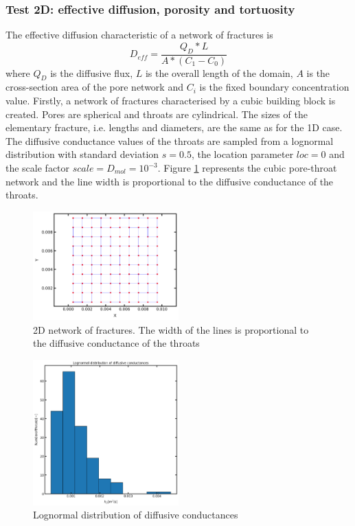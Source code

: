 \documentclass{article}
\begin{document}
\subsubsection{Test 2D: effective diffusion, porosity and tortuosity}
The effective diffusion characteristic of a network of fractures is
\begin{equation}
    D_{eff}=\frac{Q_D*L}{A*(C_1-C_0)}
    \label{eq:EffDiff}
\end{equation}
where $Q_D$ is the diffusive flux, $L$ is the overall length of the domain, $A$ is the cross-section area of the pore network and $C_i$ is the fixed boundary concentration value.
Firstly, a network of fractures characterised by a cubic building block is created. Pores are spherical and throats are cylindrical. The sizes of the elementary fracture, i.e. lengths and diameters, are the same as for the 1D case. The diffusive conductance values of the throats are sampled from a lognormal distribution with standard deviation $s=0.5$, the location parameter $loc=0$ and the scale factor $scale=D_{mol}=10^{-3}$. Figure \ref{fig:Network} represents the cubic pore-throat network and the line width is proportional to the diffusive conductance of the throats.
\FloatBarrier  %
\begin{figure}[htbp]
    \centering
    \includegraphics[width=0.5\textwidth]{images/fromOpenPNM/rectangular2Dpn.png}
    \caption{2D network of fractures. The width of the lines is proportional to the diffusive conductance of the throats}
    \label{fig:Network}
\end{figure}
\FloatBarrier  %
\begin{figure}[htbp]
    \centering
    \includegraphics[width=0.5\textwidth]{images/fromOpenPNM/effDiffLognormalDist.png}
    \caption{Lognormal distribution of diffusive conductances}
    \label{fig:LogDiff}
\end{figure}
\end{document}
